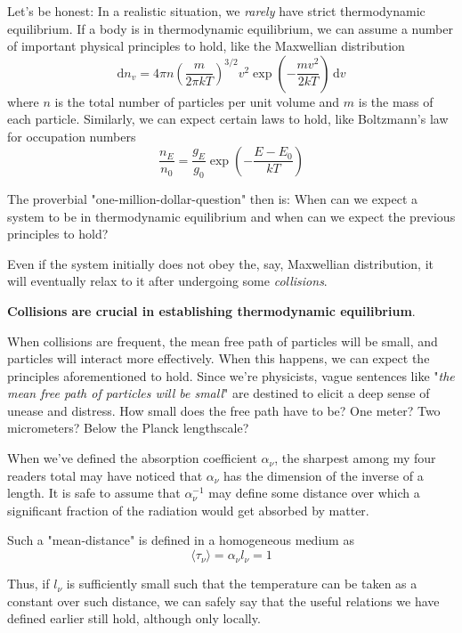 Let's be honest: In a realistic situation, we \emph{rarely} have strict thermodynamic equilibrium. If a body is in thermodynamic equilibrium, we can assume a number of important physical principles to hold, like the Maxwellian distribution 
\begin{equation}
	\text{d}n_{v} = 4\pi n \left(\frac{m}{2\pi k T}\right)^{3/2}v^{2}\exp\left(-\frac{mv^{2}}{2kT}\right)\,\text{d}v
\end{equation}
where $n$ is the total number of particles per unit volume and $m$ is the mass of each particle. Similarly, we can expect certain laws to hold, like Boltzmann's law for occupation numbers
\begin{equation}
	\frac{n_{E}}{n_{0}} = \frac{g_{E}}{g_{0}}\exp\left(-\frac{E-E_{0}}{kT}\right)
    \label{eq:boltmann-occ}
\end{equation}
\par The proverbial "one-million-dollar-question" then is: When can we expect a system to be in thermodynamic equilibrium and when can we expect the previous principles to hold?
\par Even if the system initially does not obey the, say, Maxwellian distribution, it will eventually relax to it after undergoing some \emph{collisions}.
\par \textbf{Collisions are crucial in establishing thermodynamic equilibrium}. 
\par When collisions are frequent, the mean free path of particles will be small, and particles will interact more effectively. When this happens, we can expect the principles aforementioned to hold. Since we're physicists, vague sentences like "\emph{the mean free path of particles will be small}" are destined to elicit a deep sense of unease and distress. How small does the free path have to be? One meter? Two micrometers? Below the Planck lengthscale?
\par When we've defined the absorption coefficient $\alpha_{\nu}$, the sharpest among my four readers total may have noticed that $\alpha_{\nu}$ has the dimension of the inverse of a length. It is safe to assume that $\alpha_{\nu}^{-1}$ may define some distance over which a significant fraction of the radiation would get absorbed by matter.
\par Such a "mean-distance" is defined in a homogeneous medium as 
\begin{equation*}
	\langle \tau_{\nu} \rangle = \alpha_{\nu}l_{\nu} = 1
\end{equation*}
\par Thus, if $l_{\nu}$ is sufficiently small such that the temperature can be taken as a constant over such distance, we can safely say that the useful relations we have defined earlier still hold, although only locally.

